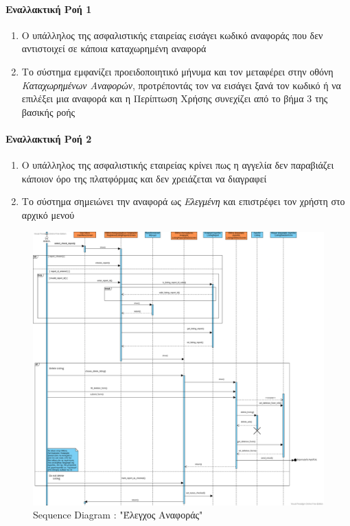 \documentclass{../ol-softwaremanual}
\begin{document}
	\paragraph{Εναλλακτική Ροή 1}
	\begin{enumerate}
		\item Ο υπάλληλος της ασφαλιστικής εταιρείας εισάγει κωδικό αναφοράς που δεν αντιστοιχεί σε κάποια καταχωρημένη αναφορά
		\item Το σύστημα εμφανίζει προειδοποιητικό μήνυμα και τον μεταφέρει στην οθόνη \textit{Καταχωρημένων Αναφορών}, προτρέποντάς τον να εισάγει ξανά τον κωδικό ή να επιλέξει μια αναφορά και η Περίπτωση Χρήσης συνεχίζει από το βήμα 3 της βασικής ροής
	\end{enumerate}	
	
	\paragraph{Εναλλακτική Ροή 2}
	\begin{enumerate}
		\item Ο υπάλληλος της ασφαλιστικής εταιρείας κρίνει πως η αγγελία δεν παραβιάζει κάποιον όρο της πλατφόρμας και δεν χρειάζεται να διαγραφεί
		\item Το σύστημα σημειώνει την αναφορά ως \textit{Ελεγμένη}	και επιστρέφει τον χρήστη στο αρχικό μενού
	\end{enumerate}
	
	\begin{figure}[htbp!]
		\centering
		\includegraphics[scale=0.285]{img/seq_check_report.png}
		\caption{\en Sequence Diagram : "\gr Έλεγχος Αναφοράς\en"\gr}
	\end{figure}
	
\end{document}
